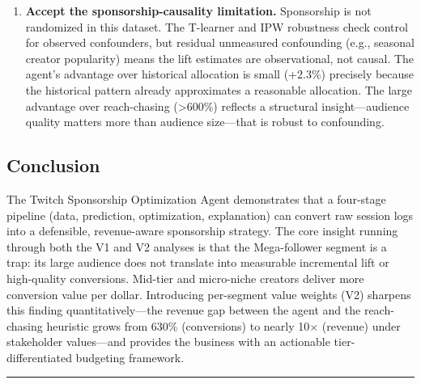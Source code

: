 \documentclass[11pt,letterpaper]{article}
\begin{document}
\begin{enumerate}[nosep, leftmargin=1.5em]
  \item \textbf{Accept the sponsorship-causality limitation.} Sponsorship
  is not randomized in this dataset. The T-learner and IPW robustness check
  control for observed confounders, but residual unmeasured confounding
  (e.g., seasonal creator popularity) means the lift estimates are
  observational, not causal. The agent's advantage over historical allocation
  is small (+2.3\%) precisely because the historical pattern already
  approximates a reasonable allocation. The large advantage over reach-chasing
  (\textgreater 600\%) reflects a structural insight---audience quality
  matters more than audience size---that is robust to confounding.

\end{enumerate}

\subsection{Conclusion}

The Twitch Sponsorship Optimization Agent demonstrates that a four-stage
pipeline (data, prediction, optimization, explanation) can convert raw session
logs into a defensible, revenue-aware sponsorship strategy. The core insight
running through both the V1 and V2 analyses is that the Mega-follower segment
is a trap: its large audience does not translate into measurable incremental
lift or high-quality conversions. Mid-tier and micro-niche creators deliver
more conversion value per dollar. Introducing per-segment value weights
(V2) sharpens this finding quantitatively---the revenue gap between the agent
and the reach-chasing heuristic grows from 630\% (conversions) to nearly
10$\times$ (revenue) under stakeholder values---and provides the business
with an actionable tier-differentiated budgeting framework.

\vspace{8pt}
\textcolor{gold}{\rule{\linewidth}{1pt}}
\vspace{4pt}

\end{document}
